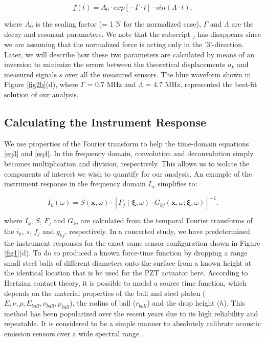 \documentclass[preprint,3p, 11pt,authoryear]{elsarticle}
\begin{document}
\begin{equation}
    \label{eq4b}
   f(t) = A_{0} \cdot exp[- \Gamma \cdot t]\cdot sin(\Lambda\cdot t) ,
\end{equation}

\noindent where $A_{0}$ is the scaling factor (= 1 N for the normalized case), $\Gamma$ and $\Lambda$ are the decay and resonant parameters. We note that the subscript $_{j}$ has disappears since we are assuming that the normalized force is acting only in the '$3$'-direction. Later, we will describe how these two parameters are calculated by means of an inversion to minimize the errors between the theoretical displacements $u_{k}$ and measured signals $s$ over all the measured sensors. The blue waveform shown in Figure \ref{fig2b}(d), where $\Gamma$ = 0.7 MHz and $\Lambda$ = 4.7 MHz, represented the best-fit solution of our analysis.

\subsection{Calculating the Instrument Response}

We use properties of the Fourier transform \citep{Bracewell1986} to help the time-domain equations \eqref{eq3} and \eqref{eq4}. In the frequency domain, convolution and deconvolution simply becomes multiplication and division, respectively. This allows us to isolate the components of interest we wish to quantify for our analysis. An example of the instrument response in the frequency domain $I_{w}$ simplifies to:

\begin{equation}
    \label{eq5}
        I_{k}\left(\omega \right) = 
        S\left( \mathbf{x}, \omega \right) \cdot \left[ F_{j}\left( \mathbf{\xi}, \omega \right) \cdot G_{kj}\left( \mathbf{x}, \omega; \mathbf{\xi}, \omega \right)\right]^{-1} .
\end{equation}

\noindent where $I_{k}$, $S$, $F_{j}$ and $G_{kj}$ are calculated from the temporal Fourier transforms of the $i_{k}$, $s$, $f_{j}$ and $g_{kj}$, respectively.  In a concerted study, we have predetermined the instrument responses for the exact same sensor configuration shown in Figure \ref{fig1}(d).  To do so \citet{Wu} produced a known force-time function by dropping a range small steel balls of different diameters onto the surface from a known height at the identical location that is be used for the PZT actuator here. According to Hertzian contact theory, it is possible to model a source time function, which depends on the material properties of the ball and steel platen ($E, \nu, \rho, E_{ball}, \nu_{ball}, \rho_{ball}$), the radius of ball ($r_{ball}$) and the drop height ($h$). This method has been popularized over the recent years due to its high reliability and repeatable. It is considered to be a simple manner to absolutely calibrate acoustic emission sensors over a wide spectral range \citep{Breckenridge1990, McLaskey2010, McLaskey2012, McLaskey2015}. 
\end{document}
